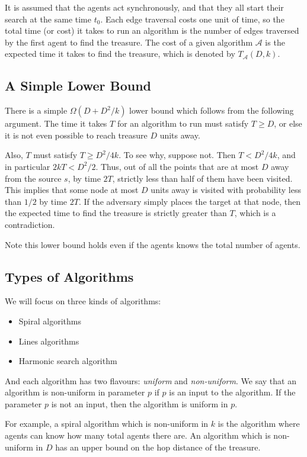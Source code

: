 \documentclass[runningheads,a4paper]{llncs}
\begin{document}
It is assumed that the agents act synchronously, and that they all start their search at the same time $t_0$. Each edge traversal costs one unit of time, so the total time (or cost) it takes to run an algorithm is the number of edges traversed by the first agent to find the treasure. The cost of a given algorithm $\mathcal{A}$ is the expected time it takes to find the treasure, which is denoted by $T_\mathcal{A}(D,k)$.

\subsection{A Simple Lower Bound}

There is a simple $\Omega(D+D^2/k)$ lower bound which follows from the following argument. The time it takes $T$ for an algorithm to run must satisfy $T \geq D$, or else it is not even possible to reach treasure $D$ units away. 

Also, $T$ must satisfy $T \geq D^2/4k$. To see why, suppose not. Then $T < D^2/4k$, and in particular $2kT < D^2/2$. Thus, out of all the points that are at most $D$ away from the source $s$, by time $2T$, strictly less than half of them have been visited. This implies that some node at most $D$ units away is visited with probability less than $1/2$ by time $2T$. If the adversary simply places the target at that node, then the expected time to find the treasure is strictly greater than $T$, which is a contradiction.

Note this lower bound holds even if the agents knows the total number of agents. 

\subsection{Types of Algorithms}
We will focus on three kinds of algorithms:
\begin{itemize}
\item Spiral algorithms
\item Lines algorithms
\item Harmonic search algorithm
\end{itemize}

And each algorithm has two flavours: \emph{uniform} and \emph{non-uniform}. We say that an algorithm is non-uniform in parameter $p$ if $p$ is an input to the algorithm. If the parameter $p$ is not an input, then the algorithm is uniform in $p$. 

For example, a spiral algorithm which is non-uniform in $k$ is the algorithm where agents can know how many total agents there are. An algorithm which is non-uniform in $D$ has an upper bound on the hop distance of the treasure. 
\end{document}
